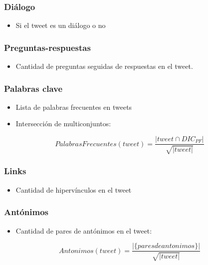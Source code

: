 \begin{frame}
    \frametitle{Diálogo}

    \begin{itemize}
        \item Si el tweet es un diálogo o no
    \end{itemize}
\end{frame}

\begin{frame}
    \frametitle{Preguntas-respuestas}

    \begin{itemize}
        \item Cantidad de preguntas seguidas de respuestas en el tweet.
    \end{itemize}
\end{frame}

\begin{frame}
    \frametitle{Palabras clave}

    \begin{itemize}
        \item Lista de palabras frecuentes en tweets
        \item Intersección de multiconjuntos:
    \end{itemize}

    \begin{center}
        \[
            PalabrasFrecuentes(tweet) = \frac{|tweet \cap DIC_{PF}|}{\sqrt{|tweet|}}
        \]
    \end{center}
\end{frame}

\begin{frame}
    \frametitle{Links}

    \begin{itemize}
        \item Cantidad de hipervínculos en el tweet
    \end{itemize}
\end{frame}

\begin{frame}
    \frametitle{Antónimos}

    \begin{itemize}
        \item Cantidad de pares de antónimos en el tweet:
    \end{itemize}

    \begin{center}
        \[
            Antonimos(tweet) = \frac{|\{pares de antonimos\}|}{\sqrt{|tweet|}}
        \]
    \end{center}
\end{frame}

